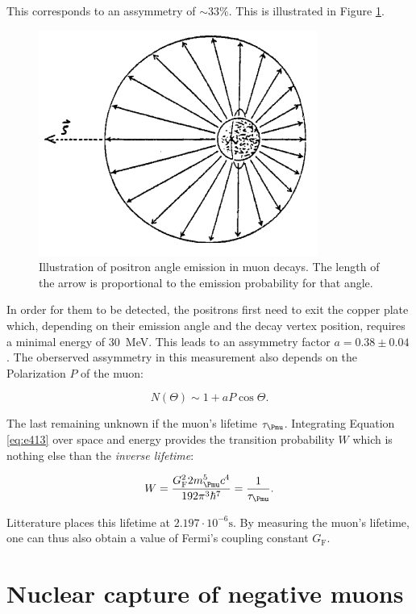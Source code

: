 This corresponds to an assymmetry of $\sim 33\%$. This is illustrated in Figure \ref{fig:emassy}.

\begin{figure}[htbp]
\centering
\includegraphics[width=0.7\linewidth]{./fig/emassy.png}
\caption{Illustration of positron angle emission in muon decays. The length of the arrow is proportional to the emission probability for that angle.}
\label{fig:emassy}
\end{figure}

In order for them to be detected, the positrons first need to exit the copper plate which, depending on their emission angle and the decay vertex position, requires a minimal energy of \SI{30}{\mega\electronvolt}. This leads to an assymmetry factor $a=0.38\pm0.04$ \cite{Heel}. The oberserved assymmetry in this measurement also depends on the Polarization $P$ of the muon:

\begin{equation}
\label{eq:larg}
N(\Theta)\sim1+aP\cos{\Theta}.
\end{equation}

The last remaining unknown if the muon's lifetime $\tau_{\Pmu}$. Integrating Equation \ref{eq:e413} over space and energy provides the transition probability $W$ which is nothing else than the \textit{inverse lifetime}:

\begin{equation}
W=\frac{G^2_{\text{F}}2m_{\Pmu}^5c^4}{192\pi^3\hbar^7}=\frac{1}{\tau_{\Pmu}}.
\end{equation}

Litterature places this lifetime at $2.197\cdot 10^{-6} \si{\second}$. By measuring the muon's lifetime, one can thus also obtain a value of Fermi's coupling constant $G_{\text{F}}$.

\section{Nuclear capture of negative muons}

